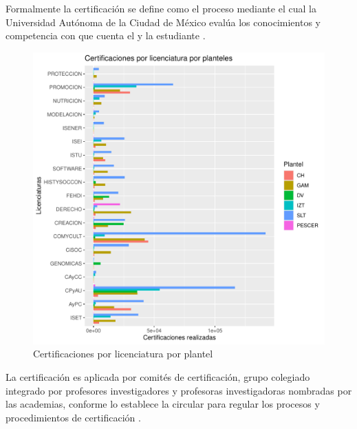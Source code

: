 \documentclass[12pt]{article}
\begin{document}
Formalmente la certificaci\'on se define como el proceso mediante el cual la Universidad Aut\'onoma de la Ciudad de M\'exico eval\'ua los conocimientos y competencia con que cuenta el y la estudiante \cite{CircularCertificacion}.

\begin{figure}
\centering
\includegraphics[scale=0.45]{Graficas/ggplotBarplotLicPlantel2.pdf}
\caption{Certificaciones por licenciatura por plantel}
\label{Fig.Cert.Lic-Plantel2}
\end{figure}


La certificaci\'on es aplicada por comit\'es de certificaci\'on, grupo colegiado integrado por profesores investigadores y profesoras investigadoras  nombradas por las academias,  conforme lo establece la circular para regular los procesos y procedimientos de certificaci\'on \cite{CircularCertificacion}.
\end{document}
